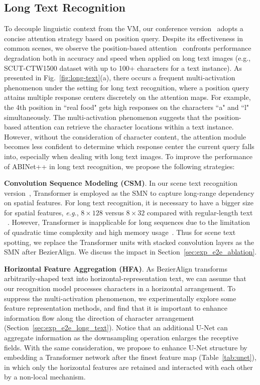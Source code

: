 \documentclass[10pt,journal,compsoc]{IEEEtran}
\def\eg{{\it e.g.}\xspace}
\begin{document}
\subsection{Long Text Recognition}

To decouple linguistic context from the VM, our conference version~\cite{fang2021read} adopts a concise attention strategy based on position query. Despite its effectiveness in common scenes, we observe the position-based attention~\cite{fang2021read,yu2020towards,lyu20192d} confronts performance degradation both in accuracy and speed when applied on long text images (e.g., SCUT-CTW1500 dataset with up to 100+ characters for a text instance). As presented in Fig.~\ref{fig:long-text}(a), there occurs a frequent multi-activation phenomenon under the setting for long text recognition, where a position query attains multiple response centers discretely on the attention maps. For example, the 4th position in ``real food" gets high responses on the characters ``a" and ``l" simultaneously. The multi-activation phenomenon suggests that the position-based attention can retrieve the character locations within a text instance. However, without the consideration of character content, the attention module becomes less confident to determine which response center the current query falls into, especially when dealing with long text images. To improve the performance of ABINet++ in long text recognition, we propose the following strategies:

\textbf{Convolution Sequence Modeling (CSM)}. In our scene text recognition version~\cite{fang2021read}, Transformer is employed as the SMN to capture long-range dependency on spatial features. For long text recognition, it is necessary to have a bigger size for spatial features, \eg, $8 \times 128$ versus $8 \times 32$ compared with regular-length text ~\cite{liu2020abcnetv2}. However, Transformer is inapplicable for long sequences due to the limitation of quadratic time complexity and high memory usage~\cite{zhou2021informer}. Thus for scene text spotting, we replace the Transformer units with stacked convolution layers as the SMN after BezierAlign. We discuss the impact in Section~\ref{sec:exp_e2e_ablation}.


\textbf{Horizontal Feature Aggregation (HFA)}. As BezierAlign transforms arbitrarily-shaped text into horizontal-representation text, we can assume that our recognition model processes characters in a horizontal arrangement. To suppress the multi-activation phenomenon, we experimentally explore some feature representation methods, and find that it is important to enhance information flow along the direction of character arrangement (Section~\ref{sec:exp_e2e_long_text}). Notice that an additional U-Net can aggregate information as the downsampling operation enlarges the receptive fields. With the same consideration, we propose to enhance U-Net structure by embedding a Transformer network after the finest feature map (Table~\ref{tab:unet}), in which only the horizontal features are retained and interacted with each other by a non-local mechanism.
\end{document}
